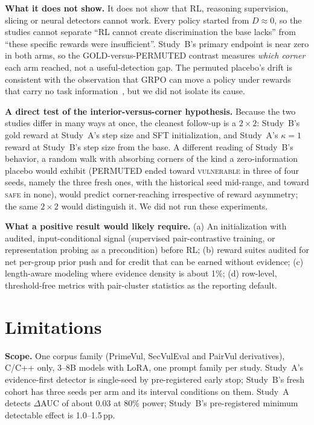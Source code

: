 \documentclass[journal]{IEEEtran}
\newcommand{\vuln}{\textsc{vulnerable}}
\newcommand{\safe}{\textsc{safe}}
\begin{document}
\textbf{What it does not show.} It does not show that RL, reasoning supervision, slicing or neural detectors cannot work. Every policy started from $D\approx0$, so the studies cannot separate ``RL cannot create discrimination the base lacks'' from ``these specific rewards were insufficient''. Study~B's primary endpoint is near zero in both arms, so the GOLD-versus-PERMUTED contrast measures \emph{which corner} each arm reached, not a useful-detection gap. The permuted placebo's drift is consistent with the observation that GRPO can move a policy under rewards that carry no task information~\cite{spurious}, but we did not isolate its cause.

\textbf{A direct test of the interior-versus-corner hypothesis.} Because the two studies differ in many ways at once, the cleanest follow-up is a $2{\times}2$: Study~B's gold reward at Study~A's step size and SFT initialization, and Study~A's $\kappa{=}1$ reward at Study~B's step size from the base. A different reading of Study~B's behavior, a random walk with absorbing corners of the kind a zero-information placebo would exhibit (PERMUTED ended toward \vuln{} in three of four seeds, namely the three fresh ones, with the historical seed mid-range, and toward \safe{} in none), would predict corner-reaching irrespective of reward asymmetry; the same $2{\times}2$ would distinguish it. We did not run these experiments.

\textbf{What a positive result would likely require.} (a) An initialization with audited, input-conditional signal (supervised pair-contrastive training, or representation probing as a precondition) before RL; (b) reward suites audited for net per-group prior push and for credit that can be earned without evidence; (c) length-aware modeling where evidence density is about 1\%; (d) row-level, threshold-free metrics with pair-cluster statistics as the reporting default.

\section{Limitations}
\label{sec:limitations}
\textbf{Scope.} One corpus family (PrimeVul, SecVulEval and PairVul derivatives), C/C++ only, 3--8B models with LoRA, one prompt family per study. Study~A's evidence-first detector is single-seed by pre-registered early stop; Study~B's fresh cohort has three seeds per arm and its interval conditions on them. Study~A detects $\Delta$AUC of about 0.03 at 80\% power; Study~B's pre-registered minimum detectable effect is 1.0--1.5\,pp.
\end{document}
